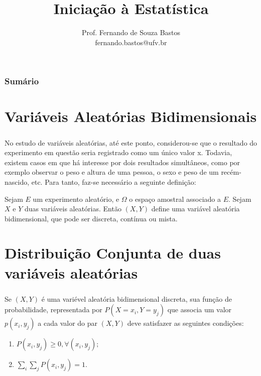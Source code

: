 \documentclass[14pt,aspectratio=1610]{beamer}
\title{Iniciação à Estatística}
\author{Prof. Fernando de Souza Bastos \texorpdfstring{\\ fernando.bastos@ufv.br}{}}
\institute{Departamento de Estatística \texorpdfstring{\\ Universidade Federal de Viçosa}{}\texorpdfstring{\\ Campus UFV - Viçosa}{}}
\date{}
\begin{document}
%

\frame{\titlepage}

\begin{frame}{}
\frametitle{\bf Sumário}
\tableofcontents
\end{frame}

\section{Variáveis Aleatórias Bidimensionais}
\begin{frame}{}
\frametitle{}
\begin{block}{}
\justifying
No estudo de variáveis aleatórias, até este ponto, considerou-se que o resultado do experimento em questão seria registrado como um único valor x. Todavia, existem casos em que há interesse por dois resultados simultâneos, como por exemplo observar o peso e altura de uma pessoa, o sexo e peso de um recém-nascido, etc. Para tanto, faz-se necessário a seguinte definição:

Sejam $E$ um experimento aleatório, e $\Omega$ o espaço amostral associado a $E$.
Sejam $X$ e $Y$ duas variáveis aleatórias. Então $(X, Y )$ define uma variável aleatória bidimensional, que pode ser discreta, contínua ou mista.
\end{block}
\end{frame}

\section{Distribuição Conjunta de duas variáveis aleatórias}
\begin{frame}{}
\frametitle{}
\begin{block}{}
\justifying
Se $(X, Y )$ é uma variével aleatória bidimensional discreta, sua função de
probabilidade, representada por $P(X = x_{i}, Y = y_{j})$ que associa um valor $p(x_{i}, y_{j})$ a cada
valor do par $(X, Y )$ deve satisfazer as seguintes condições:

\begin{enumerate}
\item $P(x_{i}, y_{j})\geq 0, \forall (x_{i}, y_{j});$
\item $\displaystyle \sum_{i} \sum_{j} P(x_{i}, y_{j}) = 1.$
\end{enumerate}
\end{block}
\end{frame}
\end{document}
